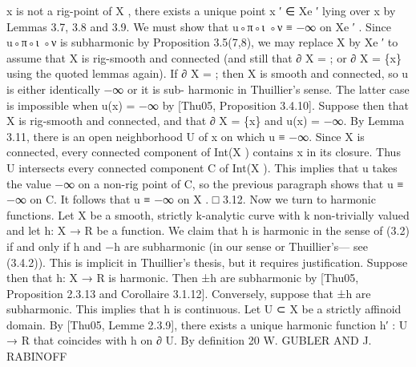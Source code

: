 \documentclass[
  10pt,
]{article}
\newenvironment{Shaded}{}{}
\newcommand{\NormalTok}[1]{#1}
\begin{document}
\begin{Shaded}
\begin{Highlighting}[]
\NormalTok{x is not a rig{-}point of X , there exists a unique point x ′ ∈ Xe ′ lying over x by Lemmas 3.7,}
\NormalTok{3.8 and 3.9. We must show that u◦π◦ι ◦ν ≡ −∞ on Xe ′ . Since u◦π◦ι ◦ν is subharmonic}
\NormalTok{by Proposition 3.5(7,8), we may replace X by Xe ′ to assume that X is rig{-}smooth and}
\NormalTok{connected (and still that ∂ X = ; or ∂ X = \{x\} using the quoted lemmas again).}
\NormalTok{    If ∂ X = ; then X is smooth and connected, so u is either identically −∞ or it is sub{-}}
\NormalTok{harmonic in Thuillier’s sense. The latter case is impossible when u(x) = −∞ by [Thu05,}
\NormalTok{Proposition 3.4.10].}
\NormalTok{    Suppose then that X is rig{-}smooth and connected, and that ∂ X = \{x\} and u(x) = −∞.}
\NormalTok{By Lemma 3.11, there is an open neighborhood U of x on which u ≡ −∞. Since X}
\NormalTok{is connected, every connected component of Int(X ) contains x in its closure. Thus U}
\NormalTok{intersects every connected component C of Int(X ). This implies that u takes the value}
\NormalTok{−∞ on a non{-}rig point of C, so the previous paragraph shows that u ≡ −∞ on C. It}
\NormalTok{follows that u ≡ −∞ on X .                                                                           □}
\NormalTok{3.12. Now we turn to harmonic functions. Let X be a smooth, strictly k{-}analytic curve}
\NormalTok{with k non{-}trivially valued and let h: X → R be a function. We claim that h is harmonic}
\NormalTok{in the sense of (3.2) if and only if h and −h are subharmonic (in our sense or Thuillier’s—}
\NormalTok{see (3.4.2)). This is implicit in Thuillier’s thesis, but it requires justification. Suppose then}
\NormalTok{that h: X → R is harmonic. Then ±h are subharmonic by [Thu05, Proposition 2.3.13 and}
\NormalTok{Corollaire 3.1.12]. Conversely, suppose that ±h are subharmonic. This implies that h is}
\NormalTok{continuous. Let U ⊂ X be a strictly affinoid domain. By [Thu05, Lemme 2.3.9], there}
\NormalTok{exists a unique harmonic function h′ : U → R that coincides with h on ∂ U. By definition}
\NormalTok{20                                 W. GUBLER AND J. RABINOFF}


\end{Highlighting}
\end{Shaded}
\end{document}
